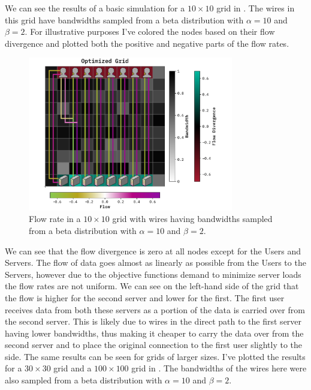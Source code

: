 \documentclass[10pt, titlepage, a4paper]{article}
\begin{document}
We can see the results of a basic simulation for a $10\times 10$ grid in \textcolor{red}{}. The wires 
in this grid have bandwidths sampled from a beta distribution with $\alpha = 10$ and $\beta = 2$. For illustrative purposes
I've colored the nodes based on their flow divergence and plotted both the positive and negative parts of the 
flow rates.

\begin{figure}[H]
    \centering
    \includegraphics[width=0.8\textwidth]{../Images/optimize-case-10.pdf}
    \caption{Flow rate in a $10\times 10$ grid with wires having bandwidths sampled from a beta distribution with $\alpha = 10$ and $\beta = 2$.}
    \label{fig:basic_grid}
\end{figure}

We can see that the flow divergence is zero at all nodes except for the Users and Servers. The flow of data goes almost 
as linearly as possible from the Users to the Servers, however due to the objective functions demand to minimize server loads 
the flow rates are not uniform. We can see on the left-hand side of the grid that the flow is higher for the second server and lower 
for the first. The first user receives data from both these servers as a portion of the data is carried over from the second 
server. This is likely due to wires in the direct path to the first server having lower bandwidths, thus making it cheaper 
to carry the data over from the second server and to place the original connection to the first user slightly to the side. 
The same results can be seen for grids of larger sizes. I've plotted the results for a $30\times 30$ grid and 
a $100\times 100$ grid in \textcolor{red}{}. The bandwidths of the wires here were also sampled from a beta distribution
with $\alpha = 10$ and $\beta = 2$.
\end{document}
